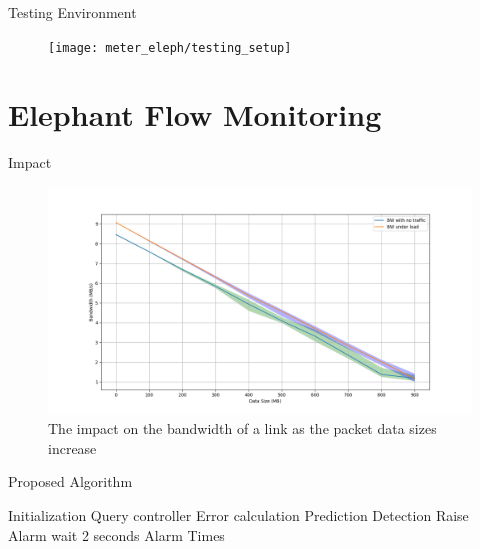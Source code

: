 \documentclass{beamer}
\begin{document}
\begin{frame}{Testing Environment}
    \begin{figure}
        \texttt{[image: meter\_eleph/testing\_setup]}
    \end{figure}
\end{frame}

\section{Elephant Flow Monitoring}

\begin{frame}{Impact}
    \begin{figure}
        \includegraphics[width=1\textwidth]{meter_eleph/bandwidth_loss_per_data_size}
        \caption{The impact on the bandwidth of a link as the packet data sizes increase}
    \end{figure}
\end{frame}

\begin{frame}{Proposed Algorithm}
    \begin{algorithm}[H]
        \caption{Elephant Detection Algorithm - High Level} \label{alg:high_level}
        \begin{algorithmic}[1]
                \State Initialization
                \Loop
                    \State Query controller
                    \State Error calculation
                    \State Prediction
                    \State Detection
                        \State Raise Alarm
                    \EndIf
                    \State wait 2 seconds
                \EndLoop
                \State \Return Alarm Times
            \EndProcedure 
           \end{algorithmic}
    \end{algorithm}
\end{frame}
\end{document}
